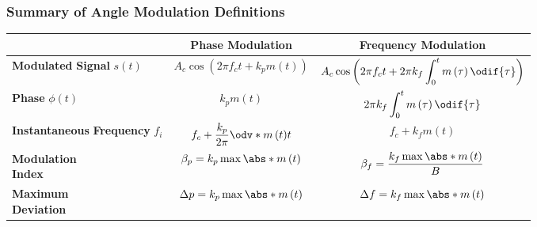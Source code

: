 \documentclass{article}
\begin{document}
\subsubsection{Summary of Angle Modulation Definitions}
\begin{table}[H]
    \centering
    \begin{tabular}{lcc}
        \toprule
                                                                                  & \textbf{Phase Modulation}                                                     & \textbf{Frequency Modulation}                                                                              \\
        \midrule
        \makecell[l]{\textbf{Modulated} \\ \textbf{Signal} \(s\left( t \right)\)} & \(\displaystyle A_c \cos{\left( 2\pi f_c t + k_p m\left( t \right) \right)}\) & \(\displaystyle A_c \cos{\left( 2\pi f_c t + 2\pi k_f \int_0^t m\left( \tau \right) \odif{\tau} \right)}\) \\[1em]
        \textbf{Phase} \(\phi\left( t \right)\)                                   & \(\displaystyle k_p m\left( t \right)\)                                       & \(\displaystyle 2\pi k_f \int_0^t m\left( \tau \right) \odif{\tau}\)                                       \\[1em]
        \makecell[l]{\textbf{Instantaneous} \\ \textbf{Frequency} \(f_i\)}        & \(\displaystyle f_c + \frac{k_p}{2\pi} \odv*{m\left( t \right)}{t}\)          & \(\displaystyle f_c + k_f m\left( t \right)\)                                                              \\[1em]
        \makecell[l]{\textbf{Modulation} \\ \textbf{Index}}                       & \(\displaystyle \beta_p = k_p \max{\abs*{m\left( t \right)}}\)                & \(\displaystyle \beta_f = \frac{k_f \max{\abs*{m\left( t \right)}}}{B}\)                                   \\[1em]
        \makecell[l]{\textbf{Maximum} \\ \textbf{Deviation}}                      & \(\displaystyle \Delta p = k_p \max{\abs*{m\left( t \right)}}\)               & \(\displaystyle \Delta f = k_f \max{\abs*{m\left( t \right)}}\)                                            \\[1em]
        \bottomrule
    \end{tabular}
\end{table}
\end{document}

